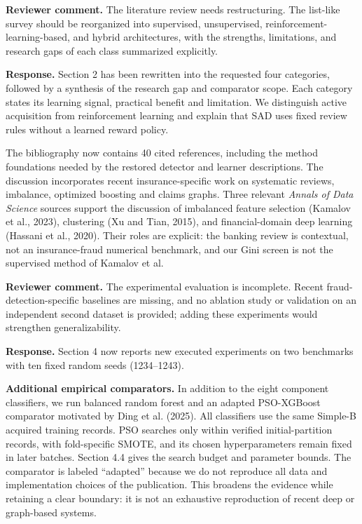 \documentclass[11pt,a4paper]{article}
\newcommand{\commentbox}[1]{\par\medskip\noindent\colorbox{blue!6}{\parbox{\dimexpr\linewidth-2\fboxsep}{\textbf{Reviewer comment.} #1}}\par}
\begin{document}
\commentbox{The literature review needs restructuring. The list-like survey
should be reorganized into supervised, unsupervised,
reinforcement-learning-based, and hybrid architectures, with the strengths,
limitations, and research gaps of each class summarized explicitly.}

\textbf{Response.} Section 2 has been rewritten into the requested four
categories, followed by a synthesis of the research gap and comparator
scope. Each category states its learning signal, practical benefit and
limitation. We distinguish active acquisition from reinforcement learning
and explain that SAD uses fixed review rules without a learned reward policy.

The bibliography now contains 40 cited references, including the method
foundations needed by the restored detector and learner descriptions.
The discussion incorporates recent insurance-specific work on systematic
reviews, imbalance, optimized boosting and claims graphs. Three relevant
\emph{Annals of Data Science} sources support the discussion of imbalanced
feature selection (Kamalov et al., 2023), clustering (Xu and Tian, 2015), and
financial-domain deep learning (Hassani et al., 2020). Their roles are
explicit: the banking review is contextual, not an insurance-fraud numerical
benchmark, and our Gini screen is not the supervised method of Kamalov et al.

\commentbox{The experimental evaluation is incomplete. Recent
fraud-detection-specific baselines are missing, and no ablation study or
validation on an independent second dataset is provided; adding these
experiments would strengthen generalizability.}

\textbf{Response.} Section 4 now reports new executed experiments on two
benchmarks with ten fixed random seeds (1234--1243).

\textbf{Additional empirical comparators.} In addition to the eight component
classifiers, we run balanced random forest and an adapted PSO-XGBoost
comparator motivated by Ding et al. (2025). All classifiers use the same
Simple-B acquired training records. PSO searches only within verified
initial-partition records, with fold-specific SMOTE, and its chosen
hyperparameters remain fixed in later batches. Section 4.4 gives the search
budget and parameter bounds. The comparator is labeled ``adapted'' because
we do not reproduce all data and implementation choices of the publication.
This broadens the evidence while retaining a clear boundary: it is not an
exhaustive reproduction of recent deep or graph-based systems.
\end{document}
